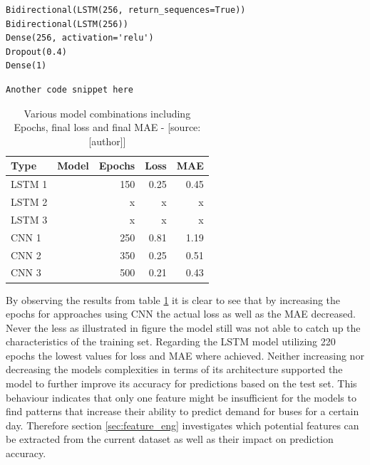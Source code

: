 \begin{lrbox}{\codebox} %
\begin{lstlisting}[numbers=none, basicstyle=\tiny, numbersep=0pt, xleftmargin=0pt, xrightmargin=0pt, backgroundcolor=\color{white}]
Bidirectional(LSTM(256, return_sequences=True))
Bidirectional(LSTM(256))
Dense(256, activation='relu')
Dropout(0.4)
Dense(1)
\end{lstlisting}
\end{lrbox} %

\begin{lrbox}{\codeboxtwo} %
\begin{lstlisting}[numbers=none, basicstyle=\tiny, numbersep=0pt, xleftmargin=0pt, xrightmargin=0pt, backgroundcolor=\color{white}]
Another code snippet here
\end{lstlisting}
\end{lrbox} %

\begin{table}[H]
\begin{tabular}{|l|p{9cm}|r|r|r|}
  \hline
  \textbf{Type} & \textbf{Model} & \textbf{Epochs} & \textbf{Loss} & \textbf{MAE} \\
  \hline
  LSTM 1& \usebox{\codebox} & 150 & 0.25 & 0.45 \\
  \hline
  LSTM 2& \usebox{\codeboxtwo} & x & x & x \\
  \hline
  LSTM 3& \usebox{\codeboxtwo} & x & x & x \\
  \hline
    CNN 1 & \usebox{\codeboxfour} & 250 & 0.81 & 1.19 \\
  \hline
   CNN 2& \usebox{\codeboxfive} & 350 & 0.25 & 0.51 \\
  \hline
   CNN 3& \usebox{\codeboxsix} & 500 & 0.21 & 0.43 \\
  \hline
\end{tabular}
\caption{Various model combinations including Epochs, final loss and final MAE - [source:[author]]}
	\label{tab:models}
\end{table}

By observing the results from table \ref{tab:models} it is clear to see that by increasing the epochs for approaches using CNN the actual loss as well as the MAE decreased. Never the less as illustrated in figure the model still was not able to catch up the characteristics of the training set. Regarding the LSTM model utilizing 220 epochs the lowest values for loss and MAE where achieved. Neither increasing nor decreasing the models complexities in terms of its architecture supported the model to further improve its accuracy for predictions based on the test set. 
This behaviour indicates that only one feature might be insufficient for the models to find patterns that increase their ability to predict demand for buses for a certain day. 
Therefore section \ref{sec:feature_eng} investigates which potential features can be extracted from the current dataset as well as their impact on prediction accuracy. 

